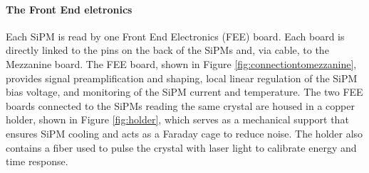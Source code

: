 \paragraph{The Front End eletronics}
Each SiPM is read by one Front End Electronics (FEE) board. 
Each board is directly linked to the pins on the back of the 
SiPMs and, via cable, to the Mezzanine board. 
The FEE board, shown in Figure \ref{fig:connectiontomezzanine}, provides 
signal preamplification and shaping, local linear regulation of the SiPM bias voltage, 
and monitoring of the SiPM current and temperature. The two FEE boards 
connected to the SiPMs reading the same crystal are housed in a copper holder, 
shown in Figure \ref{fig:holder}, which serves as a 
mechanical support that ensures SiPM cooling and acts as a Faraday cage to reduce 
noise. The holder also contains a fiber used to pulse the crystal with laser light to 
calibrate energy and time response.

